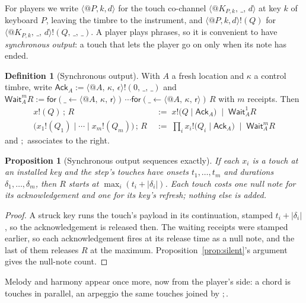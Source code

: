 \documentclass[11pt,a4paper]{article}
\makeatletter
\theoremstyle{plain}
\newtheorem{proposition}[theorem]{Proposition}
\theoremstyle{definition}
\newtheorem{definition}[theorem]{Definition}
\theoremstyle{remark}
\newcommand{\nm}[3]{\langle @#1,\,#2,\,#3\rangle}
\newcommand{\snd}[4]{#1!(#2,\,#3,\,#4)}
\newcommand{\rcv}[3]{\mathsf{for}(#1 \leftarrow #2)\,#3}
\newcommand{\len}[1]{|#1|}
\newcommand{\nulld}{\epsilon}
\newcommand{\rest}{\mathsf{r}}
\newcommand{\wild}{\_}
\makeatother
\begin{document}
For players we write $\langle @P, k, d\rangle$ for the touch co-channel
$\nm{K_{P,k}}{\wild}{d}$ at key $k$ of keyboard $P$, leaving the timbre to the
instrument, and $\langle @P, k, d\rangle!(Q)$ for
$\snd{\nm{K_{P,k}}{\wild}{d}}{Q}{\wild}{\wild}$. A player plays phrases, so it
is convenient to have \emph{synchronous output}: a touch that lets the player go
on only when its note has ended.

\begin{definition}[Synchronous output]\label{def:sync}
With $A$ a fresh location and $\kappa$ a control timbre, write
$\mathsf{Ack}_A := \snd{\nm{A}{\kappa}{\nulld}}{0}{\wild}{\wild}$ and
$\mathsf{Wait}^m_A R := \rcv{\_}{\nm{A}{\kappa}{\rest}}{\cdots\rcv{\_}{\nm{A}{\kappa}{\rest}}{R}}$
with $m$ receipts. Then
\begin{align*}
x!(Q)\,;\,R &\;:=\; x!\big(Q \mid \mathsf{Ack}_A\big) \;\mid\; \mathsf{Wait}^1_A R \\
\big(x_1!(Q_1) \mid \cdots \mid x_m!(Q_m)\big)\,;\,R &\;:=\;
  \textstyle\prod_{i} x_i!\big(Q_i \mid \mathsf{Ack}_A\big) \;\mid\; \mathsf{Wait}^m_A R
\end{align*}
and $;$ associates to the right.
\end{definition}

\begin{proposition}[Synchronous output sequences exactly]\label{prop:sync}
If each $x_i$ is a touch at an installed key and the step's touches have onsets
$t_1,\dots,t_m$ and durations $\delta_1,\dots,\delta_m$, then $R$ starts at
$\max_i(t_i + \len{\delta_i})$. Each touch costs one null note for its
acknowledgement and one for its key's refresh; nothing else is added.
\end{proposition}
\begin{proof}
A struck key runs the touch's payload in its continuation, stamped
$t_i+\len{\delta_i}$, so the acknowledgement is released then. The waiting
receipts were stamped earlier, so each acknowledgement fires at its release
time as a null note, and the last of them releases $R$ at the maximum.
Proposition~\ref{prop:silent}'s argument gives the null-note count.
\end{proof}

Melody and harmony appear once more, now from the player's side: a chord is
touches in parallel, an arpeggio the same touches joined by $;$.
\end{document}
